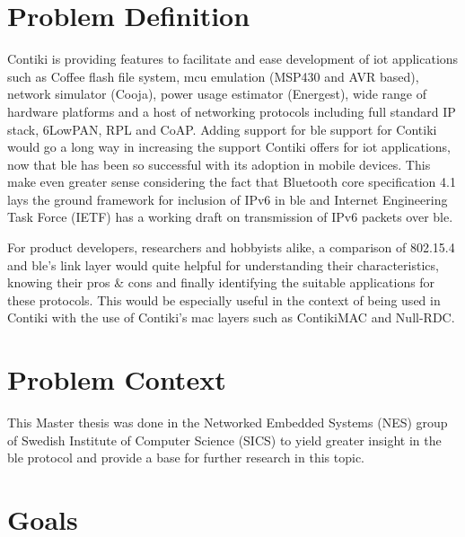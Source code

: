 

\section{Problem Definition}

Contiki is providing features to facilitate and ease development of \gls{iot} applications such as Coffee flash file system, \gls{mcu} emulation (MSP430 and AVR based), network simulator (Cooja), power usage estimator (Energest), wide range of hardware platforms and a host of networking protocols including full standard IP stack, 6LowPAN, RPL and CoAP. Adding support for \gls{ble} support for Contiki would go a long way in increasing the support Contiki offers for \gls{iot} applications, now that \gls{ble} has been so successful with its adoption in mobile devices. This make even greater sense considering the fact that Bluetooth core specification 4.1 lays the ground framework for inclusion of IPv6 in \gls{ble}\cite{4.0to4.1} and Internet Engineering Task Force (IETF)  has a working draft on transmission of IPv6 packets over \gls{ble}\cite{ieftIPv6Draft}.

For product developers, researchers and hobbyists alike, a comparison of 802.15.4 and \gls{ble}'s link layer would quite helpful for understanding their characteristics, knowing their pros \& cons and finally identifying the suitable applications for these protocols. This would be especially useful in the context of being used in Contiki with the use of Contiki's \gls{mac} layers such as ContikiMAC and Null-RDC. 


\section{Problem Context}

This Master thesis was done in the Networked Embedded Systems (NES) group of Swedish Institute of Computer Science (SICS) to yield greater insight in the \gls{ble} protocol and provide a base for further research in this topic.

\section{Goals}

